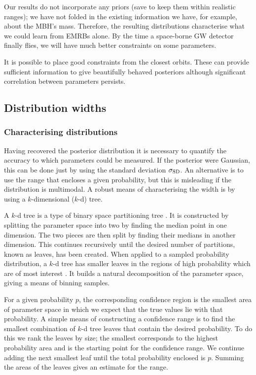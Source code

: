 Our results do not incorporate any priors (save to keep them within realistic ranges); we have not folded in the existing information we have, for example, about the MBH's mass. Therefore, the resulting distributions characterise what we could learn from EMRBs alone. By the time a space-borne GW detector finally flies, we will have much better constraints on some parameters.

It is possible to place good constraints from the closest orbits. These can provide sufficient information to give beautifully behaved posteriors although significant correlation between parameters persists.

\subsection{Distribution widths}

\subsubsection{Characterising distributions}\label{sec:k-d}

Having recovered the posterior distribution it is necessary to quantify the accuracy to which parameters could be measured. If the posterior were Gaussian, this can be done just by using the standard deviation $\sigma_\mathrm{SD}$. An alternative is to use the range that encloses a given probability, but this is misleading if the distribution is multimodal. A robust means of characterising the width is by using a $k$-dimensional ($k$-d) tree.

A $k$-d tree is a type of binary space partitioning tree \citep[sections 5.2, 12.1, 12.3]{Berg2008}. It is constructed by splitting the parameter space into two by finding the median point in one dimension. The two pieces are then split by finding their medians in another dimension. This continues recursively until the desired number of partitions, known as leaves, has been created. When applied to a sampled probability distribution, a $k$-d tree has smaller leaves in the regions of high probability which are of most interest \citep{Weinberg2012}. It builds a natural decomposition of the parameter space, giving a means of binning samples.

For a given probability $p$, the corresponding confidence region is the smallest area of parameter space in which we expect that the true values lie with that probability. A simple means of constructing a confidence range is to find the smallest combination of $k$-d tree leaves that contain the desired probability. To do this we rank the leaves by size; the smallest corresponds to the highest probability area and is the starting point for the confidence range. We continue adding the next smallest leaf until the total probability enclosed is $p$. Summing the areas of the leaves gives an estimate for the range.

